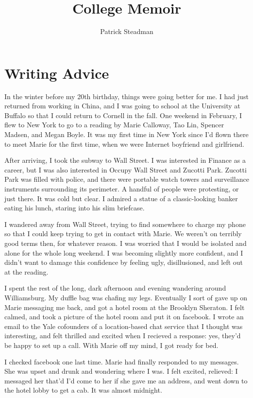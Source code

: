 \documentclass[12pt]{article}
\title{College Memoir}
\author{Patrick Steadman}
\begin{document}
\maketitle

\section{Writing Advice}
In the winter before my 20th birthday, things were going better for me.  I had
just returned from working in China, and I was going to school at the University
at Buffalo so that I could return to Cornell in the fall.  One weekend in
February, I flew to New York to go to a reading by Marie Calloway, Tao Lin,
Spencer Madsen, and Megan Boyle.  It was my first time in New York since I'd
flown there to meet Marie for the first time, when we were Internet boyfriend and
girlfriend.  

After arriving, I took the subway to Wall Street.  I was interested in Finance
as a career, but I was also interested in Occupy Wall Street and Zucotti Park.
Zucotti Park was filled with police, and there were portable watch towers and
surveillance instruments surrounding its perimeter.  A handful of people were
protesting, or just there.  It was cold but clear. I admired a statue of a
classic-looking banker eating his lunch, staring into his slim briefcase.

I wandered away from Wall Street, trying to find somewhere to charge my phone so
that I could keep trying to get in contact with Marie.  We weren't on terribly
good terms then, for whatever reason.  I was worried that I would be isolated
and alone for the whole long weekend.  I was becoming slightly more confident,
and I didn't want to damage this confidence by feeling ugly, disillusioned, and
left out at the reading.

I spent the rest of the long, dark afternoon and evening wandering around
Williamsburg.  My duffle bag was chafing my legs.  Eventually I sort
of gave up on Marie messaging me back, and got a hotel room at the Brooklyn
Sheraton.  I felt calmed, and took a picture of the hotel room and put it on
facebook.  I wrote an email to the Yale cofounders of a location-based chat
service that I thought was interesting, and felt thrilled and excited when I
recieved a response: yes, they'd be happy to set up a call.  With Marie off my
mind, I got ready for bed.  

I checked facebook one last time.  Marie had finally responded to my messages.
She was upset and drunk and wondering where I was.  I felt excited, relieved: I
messaged her that'd I'd come to her if she gave me an address, and went down to
the hotel lobby to get a cab.  It was almost midnight.
\end{document}
